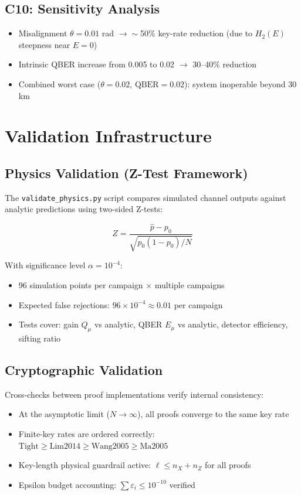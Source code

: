 \documentclass[11pt,a4paper,oneside]{report}
\begin{document}
\subsection{C10: Sensitivity Analysis}
\begin{itemize}
\item Misalignment $\theta = 0.01$ rad $\to \sim$50\% key-rate reduction (due to $H_2(E)$ steepness near $E=0$)
\item Intrinsic QBER increase from 0.005 to 0.02 $\to$ 30–40\% reduction
\item Combined worst case ($\theta = 0.02$, $\text{QBER}=0.02$): system inoperable beyond 30 km
\end{itemize}

\section{Validation Infrastructure}

\subsection{Physics Validation (Z-Test Framework)}

The \texttt{validate\_physics.py} script compares simulated channel outputs against analytic predictions using two-sided Z-tests:

\begin{equation}
Z = \frac{\hat{p} - p_0}{\sqrt{p_0(1-p_0)/N}}
\end{equation}

With significance level $\alpha = 10^{-4}$:
\begin{itemize}
\item 96 simulation points per campaign $\times$ multiple campaigns
\item Expected false rejections: $96 \times 10^{-4} \approx 0.01$ per campaign
\item Tests cover: gain $Q_\mu$ vs analytic, QBER $E_\mu$ vs analytic, detector efficiency, sifting ratio
\end{itemize}

\subsection{Cryptographic Validation}

Cross-checks between proof implementations verify internal consistency:
\begin{itemize}
\item At the asymptotic limit ($N \to \infty$), all proofs converge to the same key rate
\item Finite-key rates are ordered correctly: $\text{Tight} \geq \text{Lim}2014 \geq \text{Wang}2005 \geq \text{Ma}2005$
\item Key-length physical guardrail active: $\ell \leq n_X + n_Z$ for all proofs
\item Epsilon budget accounting: $\sum \varepsilon_i \leq 10^{-10}$ verified
\end{itemize}
\end{document}
